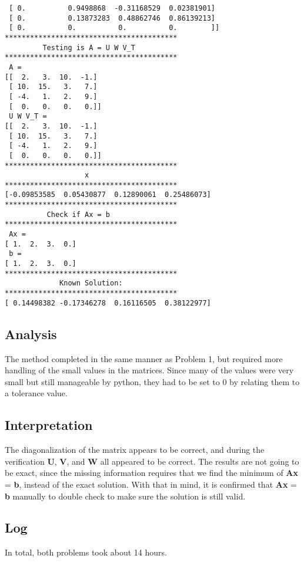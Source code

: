 \documentclass[10pt,letter]{article}
\begin{document}
\begin{verbatim}
 [ 0.          0.9498868  -0.31168529  0.02381901]
 [ 0.          0.13873283  0.48862746  0.86139213]
 [ 0.          0.          0.          0.        ]]
*****************************************
         Testing is A = U W V_T          
*****************************************
 A = 
[[  2.   3.  10.  -1.]
 [ 10.  15.   3.   7.]
 [ -4.   1.   2.   9.]
 [  0.   0.   0.   0.]]
 U W V_T = 
[[  2.   3.  10.  -1.]
 [ 10.  15.   3.   7.]
 [ -4.   1.   2.   9.]
 [  0.   0.   0.   0.]]
*****************************************
                   x                     
*****************************************
[-0.09853585  0.05430877  0.12890061  0.25486073]
*****************************************
          Check if Ax = b                
*****************************************
 Ax = 
[ 1.  2.  3.  0.]
 b = 
[ 1.  2.  3.  0.]
*****************************************
             Known Solution:             
*****************************************
[ 0.14498382 -0.17346278  0.16116505  0.38122977]
\end{verbatim}

\subsection{Analysis}

The method completed in the same manner as Problem 1, but required more handling of the small values in the matrices. Since many of the values were very small but still manageable by python, they had to be set to 0 by relating them to a tolerance value.

\subsection{Interpretation}

The diagonalization of the matrix appears to be correct, and during the verification \textbf{U}, \textbf{V}, and \textbf{W} all appeared to be correct. The results are not going to be exact, since the missing information requires that we find the minimum of \textbf{Ax} = \textbf{b}, instead of the exact solution. With that in mind, it is confirmed that \textbf{Ax} = \textbf{b} manually to double check to make sure the solution is still valid.

\subsection{Log}

In total, both problems took about 14 hours.
\end{document}
